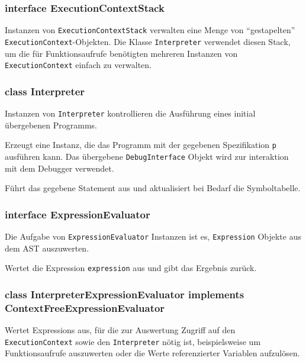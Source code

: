 \subsubsection{interface ExecutionContextStack}

Instanzen von \texttt{ExecutionContextStack} verwalten eine Menge von ``gestapelten'' \texttt{ExecutionContext}-Objekten. Die Klasse \texttt{Interpreter} verwendet diesen Stack, um die für Funktionsaufrufe benötigten mehreren Instanzen von \texttt{ExecutionContext} einfach zu verwalten.

\subsubsection{class Interpreter}

Instanzen von \texttt{Interpreter} kontrollieren die Ausführung eines initial übergebenen Programms.

\begin{description}
    Erzeugt eine Instanz, die das Programm mit der gegebenen Spezifikation \texttt{p} ausführen kann. Das übergebene \texttt{DebugInterface} Objekt wird zur interaktion mit dem Debugger verwendet.

    Führt das gegebene Statement aus und aktualisiert bei Bedarf die Symboltabelle.
\end{description}


\subsubsection{interface ExpressionEvaluator}
Die Aufgabe von \texttt{ExpressionEvaluator} Instanzen ist es, \texttt{Expression} Objekte aus dem AST auszuwerten.
\begin{description}
    Wertet die Expression \texttt{expression} aus und gibt das Ergebnis zurück.
\end{description}

\subsubsection{class InterpreterExpressionEvaluator implements ContextFreeExpressionEvaluator}
Wertet Expressions aus, für die zur Auswertung Zugriff auf den \texttt{ExecutionContext} sowie den \texttt{Interpreter} nötig ist, beispielsweise um Funktionsaufrufe auszuwerten oder die Werte referenzierter Variablen aufzulösen.

